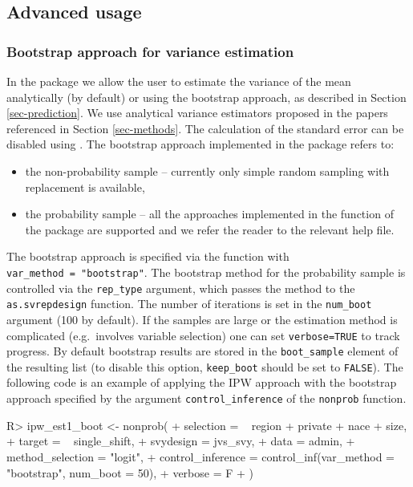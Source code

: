 \documentclass[
]{jss}
\begin{document}
\subsection{Advanced usage}\label{advanced-usage}

\subsubsection{Bootstrap approach for variance
estimation}\label{bootstrap-approach-for-variance-estimation}

In the package we allow the user to estimate the variance of the mean
analytically (by default) or using the bootstrap approach, as described
in Section \ref{sec-prediction}. We use analytical variance estimators
proposed in the papers referenced in Section \ref{sec-methods}. The
calculation of the standard error can be disabled using
. The bootstrap approach implemented in the
package refers to:

\begin{itemize}
\item the non-probability sample -- currently only simple random sampling with replacement is available,
\item the probability sample -- all the approaches implemented in the  function of the  package are supported and we refer the reader to the relevant help file. 
\end{itemize}

The bootstrap approach is specified via the 
function with \texttt{var\_method\ =\ "bootstrap"}. The bootstrap method
for the probability sample is controlled via the \texttt{rep\_type}
argument, which passes the method to the \texttt{as.svrepdesign}
function. The number of iterations is set in the \texttt{num\_boot}
argument (100 by default). If the samples are large or the estimation
method is complicated (e.g.~involves variable selection) one can set
\texttt{verbose=TRUE} to track progress. By default bootstrap results
are stored in the \texttt{boot\_sample} element of the resulting list
(to disable this option, \texttt{keep\_boot} should be set to
\texttt{FALSE}). The following code is an example of applying the IPW
approach with the bootstrap approach specified by the argument
\texttt{control\_inference} of the \texttt{nonprob} function.

\begin{CodeChunk}
\begin{CodeInput}
R> ipw_est1_boot <- nonprob(
+   selection = ~ region + private + nace + size,
+   target = ~ single_shift,
+   svydesign = jvs_svy,
+   data = admin,
+   method_selection = "logit",
+   control_inference = control_inf(var_method = "bootstrap", num_boot = 50),
+   verbose = F
+ )
\end{CodeInput}
\end{CodeChunk}
\end{document}
